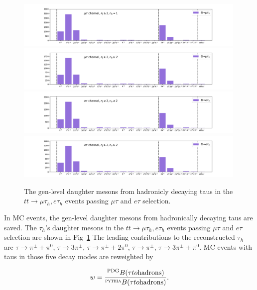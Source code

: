 \begin{figure}
    \centering
    \includegraphics[width=0.99\textwidth]{chapters/Appendix/sectionTauBr/figures/tauhDecay_mutau.png}
    \includegraphics[width=0.99\textwidth]{chapters/Appendix/sectionTauBr/figures/tauhDecay_mutau2.png}
    \includegraphics[width=0.99\textwidth]{chapters/Appendix/sectionTauBr/figures/tauhDecay_etau.png}
    \includegraphics[width=0.99\textwidth]{chapters/Appendix/sectionTauBr/figures/tauhDecay_etau2.png}
    \caption{The gen-level daughter mesons from hadronicly decaying taus in the $tt\to \mu \tau_h, e \tau_h$ events passing $\mu \tau$ and $e \tau$ selection.}
    \label{fig:appendix:reweightTauhBr:tauhBr}
\end{figure}


In MC events, the gen-level daughter mesons from hadronically decaying taus are saved. 
The $\tau_h$'s daughter mesons in the $tt\to \mu \tau_h, e \tau_h$ events 
passing $\mu \tau$ and $e \tau$ selection are shown
in Fig~\ref{fig:appendix:reweightTauhBr:tauhBr}
The leading contributions to the reconstructed $\tau_h$ are 
$\tau\to \pi^\pm+\pi^0 $, $\tau\to 3\pi^\pm$, $\tau\to \pi^\pm+2\pi^0$, $\tau\to
\pi^\pm$, $\tau\to 3\pi^\pm + \pi^0$. 
MC events with taus in those five decay modes are reweighted by 

\begin{equation}
  w = \frac{^{\rm PDG} B(\tau to  \rm{hadrons}) }{^{\rm {\textsc{pythia}}} B( \tau to \rm{hadrons} )}. 
\end{equation} 


